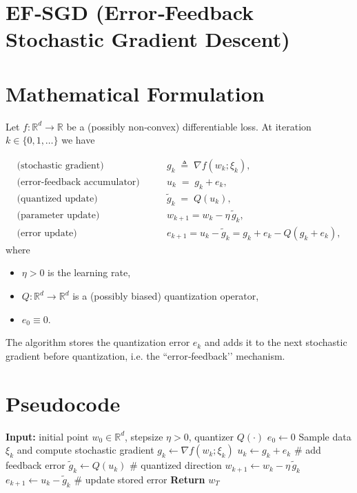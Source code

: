 \documentclass{article}
\newcommand{\R}{\mathbb{R}}
\begin{document}
\section*{EF‑SGD (Error‑Feedback Stochastic Gradient Descent)}

\section*{Mathematical Formulation}
Let $f:\R^{d}\rightarrow\R$ be a (possibly non‑convex) differentiable loss.  
At iteration $k\in\{0,1,\dots\}$ we have

\begin{align}
\text{(stochastic gradient)}\qquad & g_k \;\triangleq\; \nabla f(w_k;\xi_k), \label{eq:sg}\\[4pt]
\text{(error‑feedback accumulator)}\qquad & 
u_k \;=\; g_k + e_k, \label{eq:u}\\[4pt]
\text{(quantized update)}\qquad & 
\tilde g_k \;=\; Q(u_k), \label{eq:quant}\\[4pt]
\text{(parameter update)}\qquad &
w_{k+1}= w_k - \eta\,\tilde g_k, \label{eq:update}\\[4pt]
\text{(error update)}\qquad &
e_{k+1}= u_k - \tilde g_k = g_k+e_k- Q(g_k+e_k), \label{eq:error}
\end{align}
where
\begin{itemize}
    \item $\eta>0$ is the learning rate,
    \item $Q:\R^{d}\rightarrow\R^{d}$ is a (possibly biased) quantization operator,
    \item $e_0\equiv 0$.
\end{itemize}
The algorithm stores the quantization error $e_k$ and adds it to the next stochastic gradient before quantization, i.e. the “error‑feedback’’ mechanism.

\section*{Pseudocode}
\begin{algorithm}[H]
\caption{EF‑SGD}
\begin{algorithmic}[1]
\STATE \textbf{Input:} initial point $w_0\in\R^{d}$, stepsize $\eta>0$, quantizer $Q(\cdot)$
\STATE $e_0\gets 0$
    \STATE Sample data $\xi_k$ and compute stochastic gradient $g_k\gets\nabla f(w_k;\xi_k)$
    \STATE $u_k\gets g_k+e_k$ \hfill \# add feedback error
    \STATE $\tilde g_k\gets Q(u_k)$ \hfill \# quantized direction
    \STATE $w_{k+1}\gets w_k-\eta\,\tilde g_k$
    \STATE $e_{k+1}\gets u_k-\tilde g_k$ \hfill \# update stored error
\ENDFOR
\STATE \textbf{Return} $w_T$
\end{algorithmic}
\end{algorithm}
\end{document}
